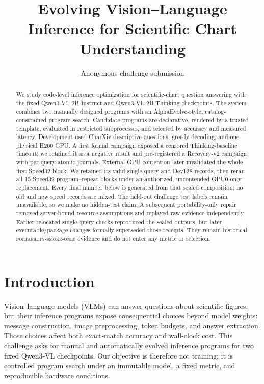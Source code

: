 \documentclass{article}
\title{Evolving Vision--Language Inference for Scientific Chart Understanding}
\author{Anonymous challenge submission}
\date{}
\begin{document}
\maketitle

\begin{abstract}
We study code-level inference optimization for scientific-chart question answering
with the fixed Qwen3-VL-2B-Instruct and Qwen3-VL-2B-Thinking checkpoints.
The system combines two manually designed programs with an AlphaEvolve-style,
catalog-constrained program search. Candidate programs are declarative, rendered
by a trusted template, evaluated in restricted subprocesses, and selected by
accuracy and measured latency. Development used CharXiv descriptive questions,
greedy decoding, and one physical H200 GPU. A first formal campaign exposed a
censored Thinking-baseline timeout; we retained it as a negative result and
pre-registered a Recovery-v2 campaign with per-query atomic journals. External
GPU contention later invalidated the whole first Speed32 block. We retained its
valid single-query and Dev128 records, then reran all 15 Speed32 program--repeat
blocks under an authorized, uncontended GPU0-only replacement. Every final number
below is generated from that sealed composition; no old and new speed records are
mixed. The held-out challenge test labels remain unavailable, so we make no
hidden-test claim. A subsequent portability-only repair removed server-bound
resource assumptions and replayed raw evidence independently. Earlier relocated
single-query checks reproduced the sealed outputs, but later executable/package
changes formally superseded those receipts. They remain historical
\textsc{portability-smoke-only} evidence and do not enter any metric or selection.
\end{abstract}

\section{Introduction}
Vision--language models (VLMs) can answer questions about scientific figures, but
their inference programs expose consequential choices beyond model weights:
message construction, image preprocessing, token budgets, and answer extraction.
Those choices affect both exact-match accuracy and wall-clock cost. This challenge
asks for manual and automatically evolved inference programs for two fixed Qwen3-VL
checkpoints. Our objective is therefore not training; it is controlled program
search under an immutable model, a fixed metric, and reproducible hardware
conditions.
\end{document}
